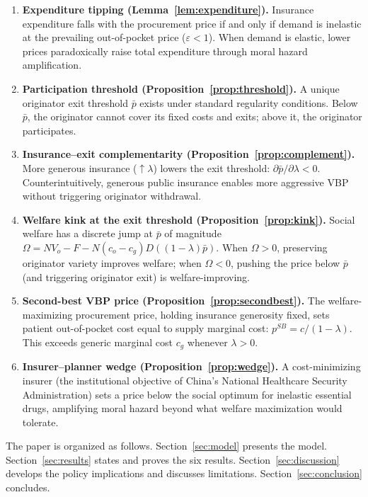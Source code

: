 \documentclass[12pt]{article}
\theoremstyle{plain}
\theoremstyle{definition}
\theoremstyle{remark}
\newcommand{\1}{\mathbf{1}}
\begin{document}
\begin{enumerate}
\item \textbf{Expenditure tipping (Lemma~\ref{lem:expenditure}).} Insurance expenditure falls with the procurement price if and only if demand is inelastic at the prevailing out-of-pocket price ($\varepsilon < 1$). When demand is elastic, lower prices paradoxically raise total expenditure through moral hazard amplification.

\item \textbf{Participation threshold (Proposition~\ref{prop:threshold}).} A unique originator exit threshold $\bar{p}$ exists under standard regularity conditions. Below $\bar{p}$, the originator cannot cover its fixed costs and exits; above it, the originator participates.

\item \textbf{Insurance--exit complementarity (Proposition~\ref{prop:complement}).} More generous insurance ($\uparrow \lambda$) lowers the exit threshold: $\partial\bar{p}/\partial\lambda < 0$. Counterintuitively, generous public insurance enables more aggressive VBP without triggering originator withdrawal.

\item \textbf{Welfare kink at the exit threshold (Proposition~\ref{prop:kink}).} Social welfare has a discrete jump at $\bar{p}$ of magnitude $\Omega = NV_o - F - N(c_o - c_g)D((1-\lambda)\bar{p})$. When $\Omega > 0$, preserving originator variety improves welfare; when $\Omega < 0$, pushing the price below $\bar{p}$ (and triggering originator exit) is welfare-improving.

\item \textbf{Second-best VBP price (Proposition~\ref{prop:secondbest}).} The welfare-maximizing procurement price, holding insurance generosity fixed, sets patient out-of-pocket cost equal to supply marginal cost: $p^{SB} = c/(1-\lambda)$. This exceeds generic marginal cost $c_g$ whenever $\lambda > 0$.

\item \textbf{Insurer--planner wedge (Proposition~\ref{prop:wedge}).} A cost-minimizing insurer (the institutional objective of China's National Healthcare Security Administration) sets a price below the social optimum for inelastic essential drugs, amplifying moral hazard beyond what welfare maximization would tolerate.
\end{enumerate}

The paper is organized as follows. Section~\ref{sec:model} presents the model. Section~\ref{sec:results} states and proves the six results. Section~\ref{sec:discussion} develops the policy implications and discusses limitations. Section~\ref{sec:conclusion} concludes.
\end{document}
